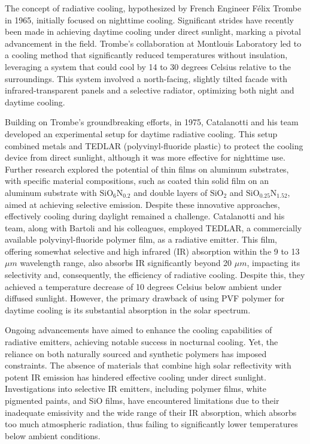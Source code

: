 The concept of radiative cooling, hypothesized by French Engineer Félix Trombe in 1965, initially focused on nighttime cooling. Significant strides have recently been made in achieving daytime cooling under direct sunlight, marking a pivotal advancement in the field. Trombe's collaboration at Montlouis Laboratory led to a cooling method that significantly reduced temperatures without insulation, leveraging a system that could cool by 14 to 30 degrees Celsius relative to the surroundings. This system involved a north-facing, slightly tilted facade with infrared-transparent panels and a selective radiator, optimizing both night and daytime cooling. %

Building on Trombe's groundbreaking efforts, in 1975, Catalanotti and his team developed an experimental setup for daytime radiative cooling. This setup combined metals and TEDLAR (polyvinyl-fluoride plastic) to protect the cooling device from direct sunlight, although it was more effective for nighttime use. Further research explored the potential of thin films on aluminum substrates, with specific material compositions, such as coated thin solid film on an aluminum substrate with $\text{SiO}_6\text{N}_{0.2}$ and double layers of $\text{SiO}_2$ and $\text{SiO}_{0.25}\text{N}_{1.52}$, aimed at achieving selective emission. Despite these innovative approaches, effectively cooling during daylight remained a challenge. Catalanotti and his team, along with Bartoli and his colleagues, employed TEDLAR, a commercially available polyvinyl-fluoride polymer film, as a radiative emitter. This film, offering somewhat selective and high infrared (IR) absorption within the 9 to 13 $\mu m$ wavelength range, also absorbs IR significantly beyond 20 $\mu m$, impacting its selectivity and, consequently, the efficiency of radiative cooling. Despite this, they achieved a temperature decrease of 10 degrees Celsius below ambient under diffused sunlight. However, the primary drawback of using PVF polymer for daytime cooling is its substantial absorption in the solar spectrum.

Ongoing advancements have aimed to enhance the cooling capabilities of radiative emitters, achieving notable success in nocturnal cooling. Yet, the reliance on both naturally sourced and synthetic polymers has imposed constraints. The absence of materials that combine high solar reflectivity with potent IR emission has hindered effective cooling under direct sunlight. Investigations into selective IR emitters, including polymer films, white pigmented paints, and SiO films, have encountered limitations due to their inadequate emissivity and the wide range of their IR absorption, which absorbs too much atmospheric radiation, thus failing to significantly lower temperatures below ambient conditions. %


